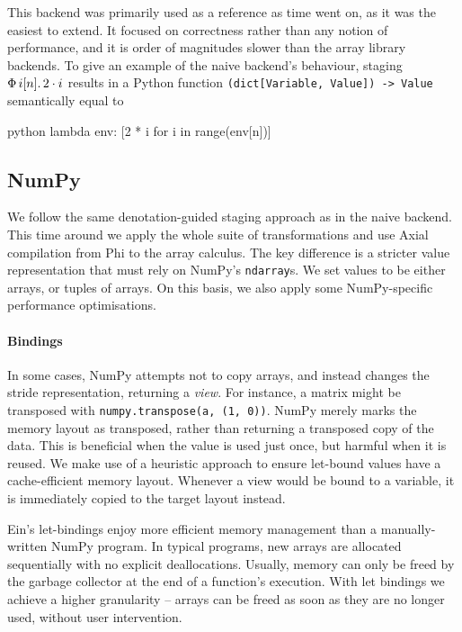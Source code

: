 This backend was primarily used as a reference as time went on, as it was the easiest to extend. It focused on correctness rather than any notion of performance, and it is order of magnitudes slower than the array library backends. To give an example of the naive backend's behaviour, staging $\Phi\, {i}[{n}] \ldotp {2 \cdot i}$ results in a Python function \texttt{(dict[Variable, Value]) -> Value} semantically equal to
\begin{center}
\begin{cminted}{python}
lambda env: [2 * i for i in range(env[n])]
\end{cminted}    
\end{center}

\subsection{NumPy}

We follow the same denotation-guided staging approach as in the naive backend. This time around we apply the whole suite of transformations and use Axial compilation from Phi to the array calculus. The key difference is a stricter value representation that must rely on NumPy's \texttt{ndarray}s. We set values to be either arrays, or tuples of arrays. On this basis, we also apply some NumPy-specific performance optimisations.

\paragraph{Bindings} In some cases, NumPy attempts not to copy arrays, and instead changes the stride representation, returning a \textit{view}. For instance, a matrix might be transposed with \texttt{numpy.transpose(a, (1, 0))}. NumPy merely marks the memory layout as transposed, rather than returning a transposed copy of the data. This is beneficial when the value is used just once, but harmful when it is reused. We make use of a heuristic approach to ensure let-bound values have a cache-efficient memory layout. Whenever a view would be bound to a variable, it is immediately copied to the target layout instead. 

Ein's let-bindings enjoy more efficient memory management than a manually-written NumPy program. In typical programs, new arrays are allocated sequentially with no explicit deallocations. Usually, memory can only be freed by the garbage collector at the end of a function's execution. With let bindings we achieve a higher granularity -- arrays can be freed as soon as they are no longer used, without user intervention.

